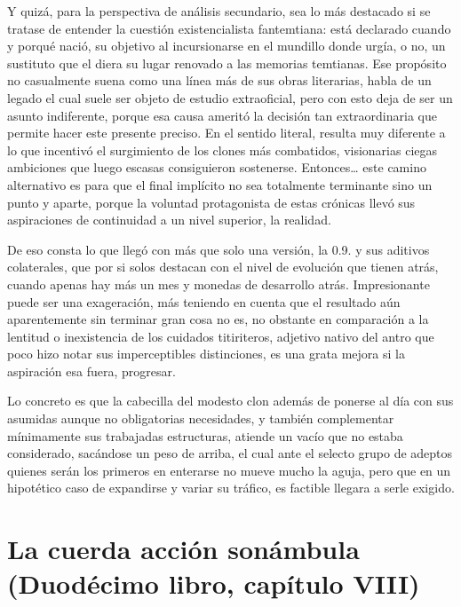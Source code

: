 \documentclass[
]{book}
\begin{document}
Y quizá, para la perspectiva de análisis secundario, sea lo más destacado si se tratase de entender la cuestión existencialista fantemtiana: está declarado cuando y porqué nació, su objetivo al incursionarse en el mundillo donde urgía, o no, un sustituto que el diera su lugar renovado a las memorias temtianas. Ese propósito no casualmente suena como una línea más de sus obras literarias, habla de un legado el cual suele ser objeto de estudio extraoficial, pero con esto deja de ser un asunto indiferente, porque esa causa ameritó la decisión tan extraordinaria que permite hacer este presente preciso. En el sentido literal, resulta muy diferente a lo que incentivó el surgimiento de los clones más combatidos, visionarias ciegas ambiciones que luego escasas consiguieron sostenerse. Entonces\ldots{} este camino alternativo es para que el final implícito no sea totalmente terminante sino un punto y aparte, porque la voluntad protagonista de estas crónicas llevó sus aspiraciones de continuidad a un nivel superior, la realidad.

De eso consta lo que llegó con más que solo una versión, la 0.9. y sus aditivos colaterales, que por si solos destacan con el nivel de evolución que tienen atrás, cuando apenas hay más un mes y monedas de desarrollo atrás. Impresionante puede ser una exageración, más teniendo en cuenta que el resultado aún aparentemente sin terminar gran cosa no es, no obstante en comparación a la lentitud o inexistencia de los cuidados titiriteros, adjetivo nativo del antro que poco hizo notar sus imperceptibles distinciones, es una grata mejora si la aspiración esa fuera, progresar.

Lo concreto es que la cabecilla del modesto clon además de ponerse al día con sus asumidas aunque no obligatorias necesidades, y también complementar mínimamente sus trabajadas estructuras, atiende un vacío que no estaba considerado, sacándose un peso de arriba, el cual ante el selecto grupo de adeptos quienes serán los primeros en enterarse no mueve mucho la aguja, pero que en un hipotético caso de expandirse y variar su tráfico, es factible llegara a serle exigido.

\hypertarget{la-cuerda-acciuxf3n-sonuxe1mbula-duoduxe9cimo-libro-capuxedtulo-viii}{%
\section{La cuerda acción sonámbula (Duodécimo libro, capítulo VIII)}\label{la-cuerda-acciuxf3n-sonuxe1mbula-duoduxe9cimo-libro-capuxedtulo-viii}}
\end{document}

